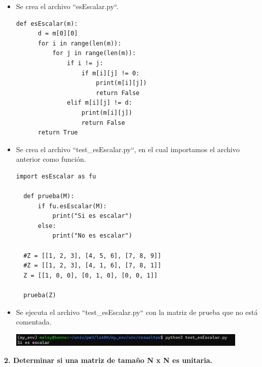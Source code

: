 \documentclass{article}
\begin{document}
  \vspace{\baselineskip}

  \begin{itemize}
  \item Se crea el archivo ``esEscalar.py``.
  
  \begin{lstlisting}[style=python]
  def esEscalar(m):
      d = m[0][0]
      for i in range(len(m)):
          for j in range(len(m)):
              if i != j:
                  if m[i][j] != 0:
                      print(m[i][j])
                      return False
              elif m[i][j] != d:
                  print(m[i][j])
                  return False
      return True
  \end{lstlisting}
  
  \item Se crea el archivo ``test\_esEscalar.py``, en el cual importamos el archivo anterior como función.
  
  \begin{lstlisting}[style=python]
  import esEscalar as fu

  def prueba(M):
      if fu.esEscalar(M):
          print("Si es escalar")
      else:
          print("No es escalar")

  #Z = [[1, 2, 3], [4, 5, 6], [7, 8, 9]]
  #Z = [[1, 2, 3], [4, 1, 6], [7, 8, 1]]
  Z = [[1, 0, 0], [0, 1, 0], [0, 0, 1]]

  prueba(Z)
  \end{lstlisting}

  \item Se ejecuta el archivo ``test\_esEscalar.py`` con la matriz de prueba que no está comentada.
  
  \begin{minipage}{\linewidth}
    \centering
    \includegraphics[width=0.9\textwidth]{imagenes/r_escalar.png}
  \end{minipage}

  \end{itemize}
    
  \pagebreak

\textbf{2. Determinar si una matriz de tamaño N x N es unitaria.}
  
  \vspace{\baselineskip}
\end{document}

